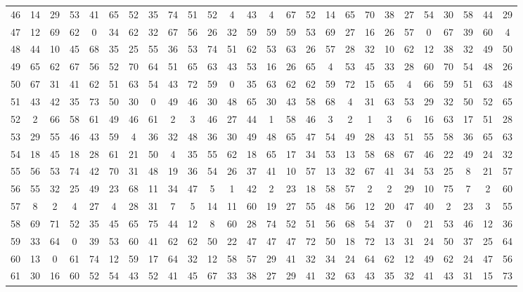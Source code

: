\begin{table}
\begin{tabular}{c c c c c c c c c c c c c c c c c c c c c c c c c c }
46 & 14 & 29 & 53 & 41 & 65 & 52 & 35 & 74 & 51 & 52 & 4 & 43 & 4 & 67 & 52 & 14 & 65 & 70 & 38 & 27 & 54 & 30 & 58 & 44 & 29 \\
47 & 12 & 69 & 62 & 0 & 34 & 62 & 32 & 67 & 56 & 26 & 32 & 59 & 59 & 59 & 53 & 69 & 27 & 16 & 26 & 57 & 0 & 67 & 39 & 60 & 4 \\
48 & 44 & 10 & 45 & 68 & 35 & 25 & 55 & 36 & 53 & 74 & 51 & 62 & 53 & 63 & 26 & 57 & 28 & 32 & 10 & 62 & 12 & 38 & 32 & 49 & 50 \\
49 & 65 & 62 & 67 & 56 & 52 & 70 & 64 & 51 & 65 & 63 & 43 & 53 & 16 & 26 & 65 & 4 & 53 & 45 & 33 & 28 & 60 & 70 & 54 & 48 & 26 \\
50 & 67 & 31 & 41 & 62 & 51 & 63 & 54 & 43 & 72 & 59 & 0 & 35 & 63 & 62 & 62 & 59 & 72 & 15 & 65 & 4 & 66 & 59 & 51 & 63 & 48 \\
51 & 43 & 42 & 35 & 73 & 50 & 30 & 0 & 49 & 46 & 30 & 48 & 65 & 30 & 43 & 58 & 68 & 4 & 31 & 63 & 53 & 29 & 32 & 50 & 52 & 65 \\
52 & 2 & 66 & 58 & 61 & 49 & 46 & 61 & 2 & 3 & 46 & 27 & 44 & 1 & 58 & 46 & 3 & 2 & 1 & 3 & 6 & 16 & 63 & 17 & 51 & 28 \\
53 & 29 & 55 & 46 & 43 & 59 & 4 & 36 & 32 & 48 & 36 & 30 & 49 & 48 & 65 & 47 & 54 & 49 & 28 & 43 & 51 & 55 & 58 & 36 & 65 & 63 \\
54 & 18 & 45 & 18 & 28 & 61 & 21 & 50 & 4 & 35 & 55 & 62 & 18 & 65 & 17 & 34 & 53 & 13 & 58 & 68 & 67 & 46 & 22 & 49 & 24 & 32 \\
55 & 56 & 53 & 74 & 42 & 70 & 31 & 48 & 19 & 36 & 54 & 26 & 37 & 41 & 10 & 57 & 13 & 32 & 67 & 41 & 34 & 53 & 25 & 8 & 21 & 57 \\
56 & 55 & 32 & 25 & 49 & 23 & 68 & 11 & 34 & 47 & 5 & 1 & 42 & 2 & 23 & 18 & 58 & 57 & 2 & 2 & 29 & 10 & 75 & 7 & 2 & 60 \\
57 & 8 & 2 & 4 & 27 & 4 & 28 & 31 & 7 & 5 & 14 & 11 & 60 & 19 & 27 & 55 & 48 & 56 & 12 & 20 & 47 & 40 & 2 & 23 & 3 & 55 \\
58 & 69 & 71 & 52 & 35 & 45 & 65 & 75 & 44 & 12 & 8 & 60 & 28 & 74 & 52 & 51 & 56 & 68 & 54 & 37 & 0 & 21 & 53 & 46 & 12 & 36 \\
59 & 33 & 64 & 0 & 39 & 53 & 60 & 41 & 62 & 62 & 50 & 22 & 47 & 47 & 47 & 72 & 50 & 18 & 72 & 13 & 31 & 24 & 50 & 37 & 25 & 64 \\
60 & 13 & 0 & 61 & 74 & 12 & 59 & 17 & 64 & 32 & 12 & 58 & 57 & 29 & 41 & 32 & 34 & 24 & 64 & 62 & 12 & 49 & 62 & 24 & 47 & 56 \\
61 & 30 & 16 & 60 & 52 & 54 & 43 & 52 & 41 & 45 & 67 & 33 & 38 & 27 & 29 & 41 & 32 & 63 & 43 & 35 & 32 & 41 & 43 & 31 & 15 & 73 \\

\end{tabular}
\end{table}

